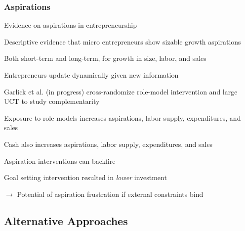 \documentclass[hideothersubsections, usenames,dvipsnames,11pt]{beamer}
\newenvironment{itemize_2pt}{\itemize\addtolength{\itemsep}{2pt}}{\enditemize}
\begin{document}
\begin{frame}
\frametitle{Aspirations}

Evidence on aspirations in entrepreneurship
\begin{itemize_2pt}
	\item Descriptive evidence that micro entrepreneurs show \textcolor{bdf}{sizable growth aspirations} \citep{Dalton2018}
	\begin{itemize_2pt}
		\item Both short-term and long-term, for growth in size, labor, and sales
		\item Entrepreneurs update dynamically given new information
	\end{itemize_2pt}
	
	\pause
	
	\item \textcolor{camel}{Garlick et al. (in progress)} cross-randomize role-model intervention and large UCT to study complementarity
	\begin{itemize_2pt}
		\item \textcolor{bdf}{Exposure to role models increases aspirations, labor supply, expenditures, and sales}
		\item Cash also increases aspirations, labor supply, expenditures, and sales
	\end{itemize_2pt}
	
	\pause
	
	\item Aspiration interventions can backfire
	\begin{itemize_2pt}
		\item Goal setting intervention resulted in \textit{lower} investment \citep{McKenzieYang2021}
		\item[] $\rightarrow$ Potential of aspiration frustration if external constraints bind 
		\item[] \quad \citep[see also,][]{Galiani2018}
	\end{itemize_2pt}

\end{itemize_2pt}
\end{frame}


\subsection{Alternative Approaches}
\end{document}
